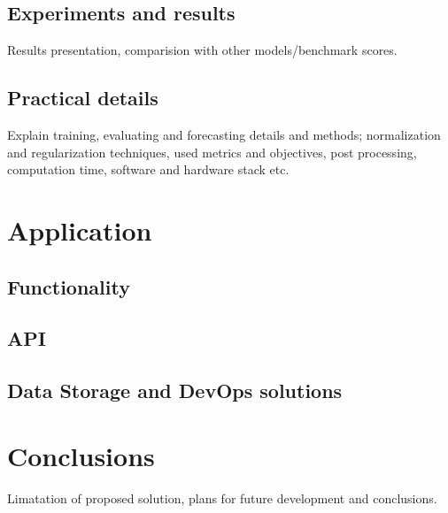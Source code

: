\documentclass{article}
\begin{document}
	\subsection{Experiments and results}
	Results presentation, comparision with other models/benchmark scores. 
	\subsection{Practical details}
	Explain training, evaluating and forecasting details and methods;
	normalization and regularization techniques, used metrics and objectives, post processing, computation time, software and hardware stack etc.
	
    \section{Application}
	
    \subsection{Functionality}
	\subsection{API}
	\subsection{Data Storage and DevOps solutions}
	
	\section{Conclusions}
	Limatation of proposed solution, plans for future development and conclusions.
	
\end{document}

